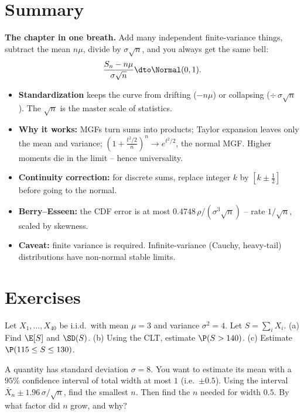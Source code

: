 \section{Summary}
\label{ch21:summary}

\begin{focusbox}
\textbf{The chapter in one breath.} Add many independent finite-variance things,
subtract the mean $n\mu$, divide by $\sigma\sqrt n$, and you always get the same bell:
\[
  \frac{S_n - n\mu}{\sigma\sqrt n} \dto \Normal(0,1).
\]
\begin{itemize}
\item \textbf{Standardization} keeps the curve from drifting ($-n\mu$) or collapsing
($\div\,\sigma\sqrt n$). The $\sqrt n$ is the master scale of statistics.
\item \textbf{Why it works:} MGFs turn sums into products; Taylor expansion leaves only
the mean and variance; $(1 + \frac{t^2/2}{n})^n \to e^{t^2/2}$, the normal MGF. Higher
moments die in the limit -- hence universality.
\item \textbf{Continuity correction:} for discrete sums, replace integer $k$ by
$[k \pm \tfrac12]$ before going to the normal.
\item \textbf{Berry--Esseen:} the CDF error is at most $0.4748\,\rho/(\sigma^3\sqrt n)$
-- rate $1/\sqrt n$, scaled by skewness.
\item \textbf{Caveat:} finite variance is required. Infinite-variance (Cauchy,
heavy-tail) distributions have non-normal stable limits.
\end{itemize}
\end{focusbox}

\section*{Exercises}

\begin{exercise}
\label{ch21:ex-standardize}
Let $X_1, \dots, X_{40}$ be i.i.d.\ with mean $\mu = 3$ and variance $\sigma^2 = 4$. Let
$S = \sum_i X_i$. (a) Find $\E[S]$ and $\SD(S)$. (b) Using the CLT, estimate
$\P(S > 140)$. (c) Estimate $\P(115 \le S \le 130)$.
\end{exercise}

\begin{exercise}
\label{ch21:ex-sqrtn}
A quantity has standard deviation $\sigma = 8$. You want to estimate its mean with a
$95\%$ confidence interval of total width at most $1$ (i.e.\ $\pm 0.5$). Using the
interval $\bar X_n \pm 1.96\,\sigma/\sqrt n$, find the smallest $n$. Then find the $n$
needed for width $0.5$. By what factor did $n$ grow, and why?
\end{exercise}

